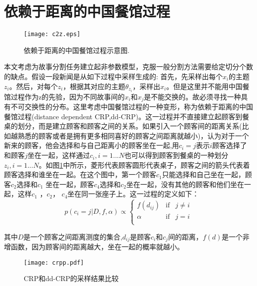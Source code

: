 \section{依赖于距离的中国餐馆过程}
\begin{figure}
  \begin{center}
  \quad\texttt{[image: c2z.eps]}\\
  \end{center}
  \caption{依赖于距离的中国餐馆过程示意图.}
  \label{f:c2z}
\end{figure}
本文考虑为故事分割任务建立起非参数模型，克服一般分割方法需要给定切分个数的缺点。假设一段新闻是从如下过程中采样生成的:
首先，先采样出每个$x_i$的主题$z_i$。然后，对每个$z_i$，根据其对应的主题$\theta_{z_i}$，采样出$x_i$。但是这里并不能用中国餐馆过程作为z的先验，因为不同故事间的$x_i$和$x_j$是不能交换的。故必须寻找一种具有不可交换性的分布。这里考虑中国餐馆过程的一种变形，称为依赖于距离的中国餐馆过程(distance dependent CRP,dd-CRP)。这一过程并不直接建立起顾客到餐桌的划分，而是建立顾客和顾客之间的关系。如果引入一个顾客间的距离关系(比如越熟悉的顾客或者是拥有更多相同喜好的顾客之间距离就越小)，认为对于一个新来的顾客，他会选择和与自己距离小的顾客坐在一起,用$c_i = j$表示$i$顾客选择了和顾客$j$坐在一起，这样通过$c_i,i = 1...N$也可以得到顾客到餐桌的一种划分$z_i,i = 1...N$。如图\ref{f:c2z}中所示，菱形代表顾客圆形代表桌子，顾客之间的箭头代表着顾客选择和谁坐在一起。在这个图中，第一个顾客$c_1$只能选择和自己坐在一起，顾客$c_2$选择和$c_1$ 坐在一起，顾客$c_4$选择和$c_2$坐在一起，没有其他的顾客和他们坐在一起，这样$c_1$ ，$c_2$， $c_4$坐在同一张座子上。这一过程的定义如下：
\begin{equation}
\label{eq2.2}
p(c_i=j|D,f,\alpha)\!\propto\!\left\{
\begin{array}{lll}
f(d_{ij}) \!\! & \text{if}\!\!\! & j \ne i \\
\alpha \!\! & \text{if}\!\!\! & j = i \\
\end{array}
\right.
\end{equation}

其中$D$是一个顾客之间距离测度的集合,$d_{ij}$是顾客$c_i$和$c_j$间的距离，$f(d)$是一个非增函数，因为顾客间的距离越大，坐在一起的概率就越小。
\begin{figure}
 \begin{center}
  \texttt{[image: crpp.pdf]}\\
  \end{center}
  \caption{CRP和dd-CRP的采样结果比较}\label{f:crpp}
\end{figure}

